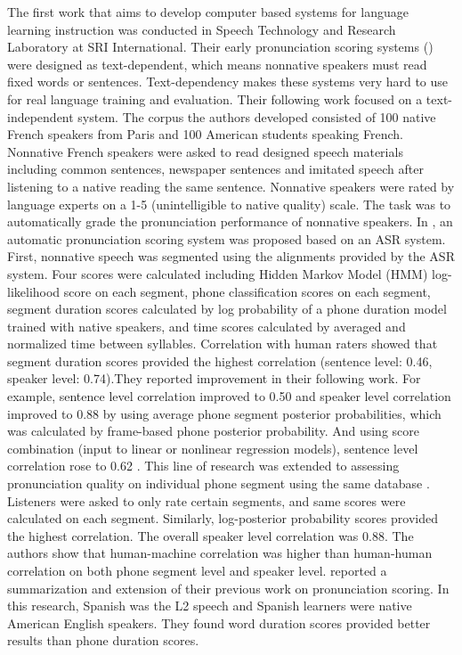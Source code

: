 The first work that aims to develop computer based systems for language learning instruction was conducted in Speech Technology and Research Laboratory at SRI International. Their early pronunciation scoring systems (\cite{bernstein1990automatic}) were designed as text-dependent, which means nonnative speakers must read fixed words or sentences. Text-dependency makes these systems very hard to use for real language training and evaluation. Their following work focused on a text-independent system. The corpus the authors developed consisted of 100 native French speakers from Paris and 100 American students speaking French. Nonnative French speakers were asked to read designed speech materials including common sentences, newspaper sentences and imitated speech after listening to a native reading the same sentence. Nonnative speakers were rated by language experts on a 1-5 (unintelligible to native quality) scale. The task was to automatically grade the pronunciation performance of nonnative speakers. In \cite{neumeyer1996automatic}, an automatic pronunciation scoring system was proposed based on an ASR system. First, nonnative speech was segmented using the alignments provided by the ASR system. Four scores were calculated including Hidden Markov Model (HMM) log-likelihood score on each segment, phone classification scores on each segment, segment duration scores calculated by log probability of a phone duration model trained with native speakers, and time scores calculated by averaged and normalized time between syllables. Correlation with human raters showed that segment duration scores provided the highest correlation (sentence level: 0.46, speaker level: 0.74).They reported improvement in their following work. For example, sentence level correlation improved to 0.50 and speaker level correlation improved to 0.88 by using average phone segment posterior probabilities, which was calculated by frame-based phone posterior probability. And using score combination (input to linear or nonlinear regression models), sentence level correlation rose to 0.62 \citep{franco1997automatic}. This line of research was extended to assessing pronunciation quality on individual phone segment using the same database \citep{kim1997automatic}. Listeners were asked to only rate certain segments, and same scores were calculated on each segment. Similarly, log-posterior probability scores provided the highest correlation. The overall speaker level correlation was 0.88. The authors show that human-machine correlation was higher than human-human correlation on both phone segment level and speaker level. \cite{xi2010eduspeak} reported a summarization and extension of their previous work on pronunciation scoring. In this research, Spanish was the L2 speech and Spanish learners were native American English speakers. They found word duration scores provided better results than phone duration scores.

